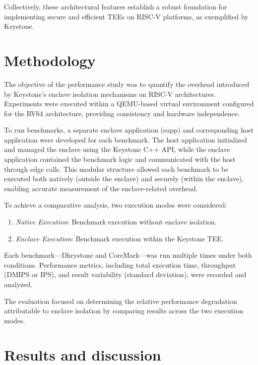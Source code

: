 \documentclass[english, version-2020-11]{uzl-thesis}
\begin{document}
Collectively, these architectural features establish a robust foundation for implementing secure and efficient TEEs on RISC-V platforms, as exemplified by Keystone.



\chapter{Methodology}
The objective of the performance study was to quantify the overhead introduced by Keystone's enclave isolation mechanisms on RISC-V architectures. Experiments were executed within a QEMU-based virtual environment configured for the RV64 architecture, providing consistency and hardware independence.

To run benchmarks, a separate enclave application (eapp) and corresponding host application were developed for each benchmark. The host application initialized and managed the enclave using the Keystone C++ API, while the enclave application contained the benchmark logic and communicated with the host through edge calls. This modular structure allowed each benchmark to be executed both natively (outside the enclave) and securely (within the enclave), enabling accurate measurement of the enclave-related overhead.

To achieve a comparative analysis, two execution modes were considered:
\begin{enumerate}
\item \textit{Native Execution}: Benchmark execution without enclave isolation.
\item \textit{Enclave Execution}: Benchmark execution within the Keystone TEE.
\end{enumerate}

Each benchmark—Dhrystone and CoreMark—was run multiple times under both conditions. Performance metrics, including total execution time, throughput (DMIPS or IPS), and result variability (standard deviation), were recorded and analyzed.

The evaluation focused on determining the relative performance degradation attributable to enclave isolation by comparing results across the two execution modes.



\chapter{Results and discussion}

\end{document}
